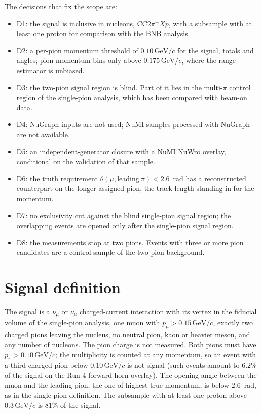 \documentclass[11pt,a4paper]{article}
\newcommand{\GeVc}{\,\text{GeV}\!/c}
\begin{document}
The decisions that fix the scope are:
\begin{itemize}[nosep]
  \item D1: the signal is inclusive in nucleons, CC$2\pi^\pm Xp$, with a subsample with at least one
        proton for comparison with the BNB analysis.
  \item D2: a per-pion momentum threshold of $0.10\GeVc$ for the signal, totals and angles;
        pion-momentum bins only above $0.175\GeVc$, where the range estimator is unbiased.
  \item D3: the two-pion signal region is blind. Part of it lies in the multi-$\pi$ control region of
        the single-pion analysis, which has been compared with beam-on data.
  \item D4: NuGraph inputs are not used; NuMI samples processed with NuGraph are not available.
  \item D5: an independent-generator closure with a NuMI NuWro overlay, conditional on the validation of that sample.
  \item D6: the truth requirement $\theta(\mu,\text{leading}~\pi)<2.6$~rad has a reconstructed
        counterpart on the longer assigned pion, the track length standing in for the momentum.
  \item D7: no exclusivity cut against the blind single-pion signal region; the overlapping events
        are opened only after the single-pion signal region.
  \item D8: the measurements stop at two pions. Events with three or more pion candidates are a
        control sample of the two-pion background.
\end{itemize}

\section{Signal definition}
\label{sec:signal}

The signal is a $\nu_\mu$ or $\bar\nu_\mu$ charged-current interaction with its vertex in the
fiducial volume of the single-pion analysis, one muon with $p_\mu>0.15\GeVc$, exactly two charged pions
leaving the nucleus, no neutral pion, kaon or heavier meson, and any number of nucleons. The pion charge is not
measured. Both pions must have $p_\pi>0.10\GeVc$; the multiplicity is counted at any momentum, so an event with
a third charged pion below $0.10\GeVc$ is not signal (such events amount to $6.2\%$ of the signal on the Run-4
forward-horn overlay). The opening angle between the muon and the leading pion, the one of highest true
momentum, is below $2.6$~rad, as in the single-pion definition. The subsample with
at least one proton above $0.3\GeVc$ is $81\%$ of the signal.
\end{document}

